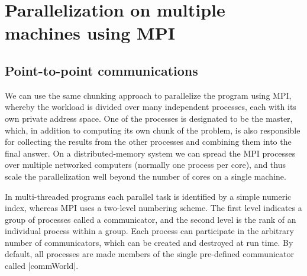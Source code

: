 \documentclass{tmr}
\begin{document}
\section{Parallelization on multiple machines using MPI}

\subsection{Point-to-point communications}

We can use the same chunking approach to parallelize the program
using MPI, whereby the workload is divided over many
independent processes, each with its own private address space.
One of the processes is designated to be the master,
which, in addition to computing its own chunk of the problem, is also responsible for
collecting the results from the other processes and combining them into the final answer.
On a distributed-memory system we can spread the MPI processes over
multiple networked computers (normally one process per core), and thus
scale the parallelization well beyond the number of cores on a single machine.

In multi-threaded programs each parallel task is identified by a simple
numeric index, whereas
MPI uses a two-level numbering scheme.
The first level indicates a group of processes called a communicator,
and the second level is the rank of an individual process within a group.
Each process can participate in the arbitrary number of communicators,
which can be created and destroyed at run time. By default, all
processes are made members of the single pre-defined communicator
called |commWorld|.
\end{document}
